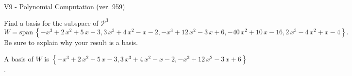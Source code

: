 \begin{exercise}
  \begin{exerciseTitle}V9 - Polynomial Computation (ver. 959)\end{exerciseTitle}
  \begin{exerciseStatement}
    Find a basis for the subspace of \(\mathcal{P}^3\) 
\[W=\mathrm{span}\ \left\{-x^{3} + 2 \, x^{2} + 5 \, x - 3 , 3 \, x^{3} + 4 \, x^{2} - x - 2 , -x^{3} + 12 \, x^{2} - 3 \, x + 6 , -40 \, x^{2} + 10 \, x - 16 , 2 \, x^{3} - 4 \, x^{2} + x - 4\right\}.\]
 Be sure to explain why your result is a basis.


  \end{exerciseStatement}
  \begin{exerciseAnswer}
   A basis of \(W\) is  \(\left\{-x^{3} + 2 \, x^{2} + 5 \, x - 3 , 3 \, x^{3} + 4 \, x^{2} - x - 2 , -x^{3} + 12 \, x^{2} - 3 \, x + 6\right\}\).
  


  \end{exerciseAnswer}
\end{exercise}